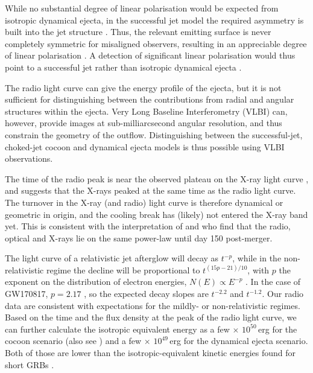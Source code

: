 While no substantial degree of linear polarisation would be expected from isotropic dynamical ejecta, in the successful jet model the required asymmetry is built into the jet structure \citep[the energy and speed of the various ejecta components are both functions of the angle from the jet axis; see e.g.][]{2018PhRvL.120x1103L}. Thus, the relevant emitting surface is never completely symmetric for misaligned observers, resulting in an appreciable degree of linear polarisation \citep[$\sim 20\%$;][]{2004MNRAS.354...86R}. A detection of significant linear polarisation would thus point to a successful jet rather than isotropic dynamical ejecta \citep[also see][]{2018MNRAS.478.4128G}.

The radio light curve can give the energy profile of the ejecta, but it is not sufficient for distinguishing between the contributions from radial and angular structures within the ejecta. Very Long Baseline Interferometry (VLBI) can, however, provide images at sub-milliarcsecond angular resolution, and thus constrain the geometry of the outflow. Distinguishing between the successful-jet, choked-jet cocoon and dynamical ejecta models is thus possible using VLBI observations.

The time of the radio peak is near the observed plateau on the X-ray light curve \citep{2018ApJ...856L..18M,2018MNRAS.478L..18T,2018ApJ...853L...4R,2018A&A...613L...1D}, and suggests that the X-rays peaked at the same time as the radio light curve.
The turnover in the X-ray (and radio) light curve is therefore dynamical or geometric in origin, and the cooling break has (likely) not entered the X-ray band yet.
This is consistent with the interpretation of \cite{2018A&A...613L...1D} and \cite{2018ApJ...856L..18M} who find that the radio, optical and X-rays lie on the same power-law until day 150 post-merger.

The light curve of a relativistic jet afterglow will decay as $t^{-p}$, while in the non-relativistic regime the decline will be proportional to $t^{(15p-21)/10}$, with $p$ the exponent on the distribution of electron energies, $N(E) \propto E^{-p}$ \citep{2002ApJ...570L..61G,2011Natur.478...82N}. In the case of GW170817, $p=2.17$ \citep[e.g.][]{2018ApJ...856L..18M,2018Natur.554..207M}, so the expected decay slopes are $t^{-2.2}$ and $t^{-1.2}$. Our radio data are consistent with expectations for the mildly- or non-relativistic regimes. Based on the time and the flux density at the peak of the radio light curve, we can further calculate the isotropic equivalent energy \citep{2018MNRAS.478..407N} as a few $\times$ $10^{50}$\,erg for the cocoon scenario (also see \citealt{2018ApJ...867...57R})
and a few $\times$ $10^{49}$\,erg for the dynamical ejecta scenario. Both of those are lower than the isotropic-equivalent kinetic energies found for short GRBs \citep{2015ApJ...815..102F}.



